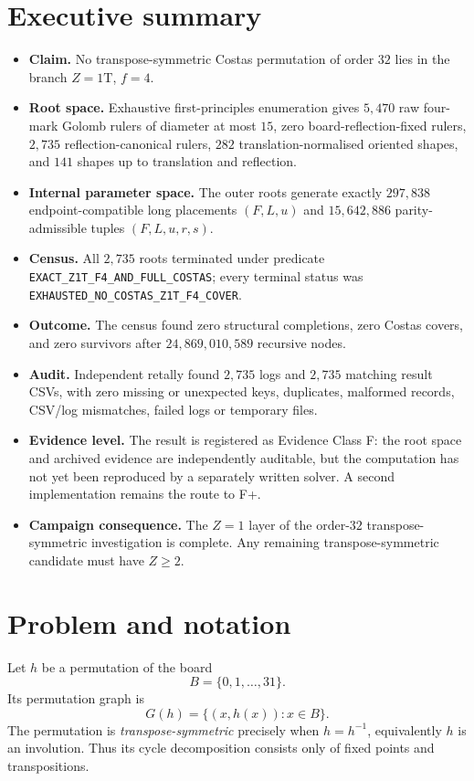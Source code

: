 \documentclass[11pt,a4paper]{article}
\theoremstyle{definition}\newtheorem{definition}[theorem]{Definition}\newtheorem{remark}[theorem]{Remark}
\newcommand{\code}[1]{\texttt{#1}}
\begin{document}
\section*{Executive summary}
\begin{itemize}
\item \textbf{Claim.} No transpose-symmetric Costas permutation of order $32$ lies in the branch $Z=1\mathrm T$, $f=4$.
\item \textbf{Root space.} Exhaustive first-principles enumeration gives $5{,}470$ raw four-mark Golomb rulers of diameter at most $15$, zero board-reflection-fixed rulers, $2{,}735$ reflection-canonical rulers, $282$ translation-normalised oriented shapes, and $141$ shapes up to translation and reflection.
\item \textbf{Internal parameter space.} The outer roots generate exactly $297{,}838$ endpoint-compatible long placements $(F,L,u)$ and $15{,}642{,}886$ parity-admissible tuples $(F,L,u,r,s)$.
\item \textbf{Census.} All $2{,}735$ roots terminated under predicate \code{EXACT\_Z1T\_F4\_AND\_FULL\_COSTAS}; every terminal status was \code{EXHAUSTED\_NO\_COSTAS\_Z1T\_F4\_COVER}.
\item \textbf{Outcome.} The census found zero structural completions, zero Costas covers, and zero survivors after $24{,}869{,}010{,}589$ recursive nodes.
\item \textbf{Audit.} Independent retally found $2{,}735$ logs and $2{,}735$ matching result CSVs, with zero missing or unexpected keys, duplicates, malformed records, CSV/log mismatches, failed logs or temporary files.
\item \textbf{Evidence level.} The result is registered as Evidence Class F: the root space and archived evidence are independently auditable, but the computation has not yet been reproduced by a separately written solver.  A second implementation remains the route to F+.
\item \textbf{Campaign consequence.} The $Z=1$ layer of the order-$32$ transpose-symmetric investigation is complete.  Any remaining transpose-symmetric candidate must have $Z\ge2$.
\end{itemize}

\tableofcontents

\section{Problem and notation}
Let $h$ be a permutation of the board
\[
B=\{0,1,\ldots,31\}.
\]
Its permutation graph is
\[
G(h)=\{(x,h(x)):x\in B\}.
\]
The permutation is \emph{transpose-symmetric} precisely when $h=h^{-1}$, equivalently $h$ is an involution.  Thus its cycle decomposition consists only of fixed points and transpositions.
\end{document}
